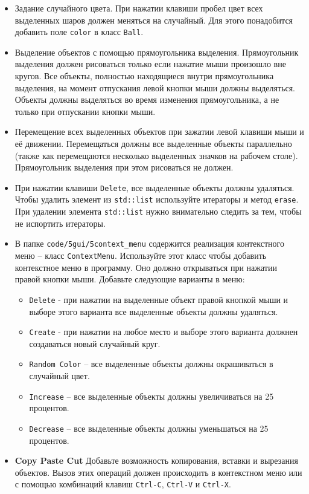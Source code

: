 \documentclass{article}
\begin{document}
\begin{itemize}
\item Задание случайного цвета. При нажатии клавиши пробел цвет всех выделенных шаров должен меняться на случайный. Для этого понадобится добавить поле \texttt{color} в класс \texttt{Ball}.

\item Выделение объектов с помощью прямоугольника выделения. Прямоугольник выделения должен рисоваться только если нажатие мыши произошло вне кругов. Все объекты, полностью находящиеся внутри прямоугольника выделения, на момент отпускания левой кнопки мыши должны выделяться. Объекты должны выделяться во время изменения прямоугольника, а не только при отпускании кнопки мыши.

\item Перемещение всех выделенных объектов при зажатии левой клавиши мыши и её движении. Перемещаться должны все выделенные объекты параллельно (также как перемещаются несколько выделенных значков на рабочем столе). Прямоугольник выделения при этом рисоваться не должен.

\item При нажатии клавиши \texttt{Delete}, все выделенные объекты должны удаляться. Чтобы удалить элемент из \texttt{std::list} используйте итераторы и метод \texttt{erase}. При удалении элемента \texttt{std::list} нужно внимательно следить за тем, чтобы не испортить итераторы.

\item В папке \texttt{code/5gui/5context\_menu} содержится реализация контекстного меню -- класс \texttt{ContextMenu}. Используйте этот класс чтобы добавить контекстное меню в программу. Оно должно открываться при нажатии правой кнопки мыши. Добавьте следующие варианты в меню:
\begin{itemize}
\item \texttt{Delete} - при нажатии на выделенные объект правой кнопкой мыши и выборе этого варианта все выделенные объекты должны удаляться.
\item \texttt{Create} - при нажатии на любое место и выборе этого варианта должнен создаваться новый случайный круг.
\item \texttt{Random Color} -- все выделенные объекты должны окрашиваться в случайный цвет.
\item \texttt{Increase} -- все выделенные объекты должны увеличиваться на 25 процентов.
\item \texttt{Decrease} -- все выделенные объекты должны уменьшаться на 25 процентов.
\end{itemize}

\item \textbf{Copy Paste Cut} Добавьте возможность копирования, вставки и вырезания объектов. Вызов этих операций должен происходить в контекстном меню или с помощью комбинаций клавиш \texttt{Ctrl-C}, \texttt{Ctrl-V} и \texttt{Ctrl-X}.
\end{itemize}
\end{document}
